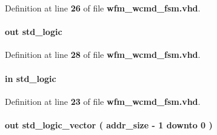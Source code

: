 Definition at line {\bf 26} of file {\bf wfm\+\_\+wcmd\+\_\+fsm.\+vhd}.

\paragraph[{wcmd\+\_\+brst\+\_\+en}]{ {\bfseries \textcolor{keywordflow}{out}\textcolor{vhdlchar}{ }} {\bfseries \textcolor{comment}{std\+\_\+logic}\textcolor{vhdlchar}{ }} \hspace{0.3cm}{\ttfamily [Port]}}\label{classwfm__wcmd__fsm_ab72031cd0cdd0c63ea34ae2f21d809da}


Definition at line {\bf 28} of file {\bf wfm\+\_\+wcmd\+\_\+fsm.\+vhd}.

\paragraph[{wcmd\+\_\+clk}]{ {\bfseries \textcolor{keywordflow}{in}\textcolor{vhdlchar}{ }} {\bfseries \textcolor{comment}{std\+\_\+logic}\textcolor{vhdlchar}{ }} \hspace{0.3cm}{\ttfamily [Port]}}\label{classwfm__wcmd__fsm_a61d32071a7feae60ffaf6be32920acff}


Definition at line {\bf 23} of file {\bf wfm\+\_\+wcmd\+\_\+fsm.\+vhd}.

\paragraph[{wcmd\+\_\+last\+\_\+addr}]{ {\bfseries \textcolor{keywordflow}{out}\textcolor{vhdlchar}{ }} {\bfseries \textcolor{comment}{std\+\_\+logic\+\_\+vector}\textcolor{vhdlchar}{ }\textcolor{vhdlchar}{(}\textcolor{vhdlchar}{ }\textcolor{vhdlchar}{ }\textcolor{vhdlchar}{ }\textcolor{vhdlchar}{ }{\bfseries {\bf addr\+\_\+size}} \textcolor{vhdlchar}{-\/}\textcolor{vhdlchar}{ } \textcolor{vhdldigit}{1} \textcolor{vhdlchar}{ }\textcolor{keywordflow}{downto}\textcolor{vhdlchar}{ }\textcolor{vhdlchar}{ } \textcolor{vhdldigit}{0} \textcolor{vhdlchar}{ }\textcolor{vhdlchar}{)}\textcolor{vhdlchar}{ }} \hspace{0.3cm}{\ttfamily [Port]}}\label{classwfm__wcmd__fsm_a9c0c96b10d46b49e0f479b1cc936a3ac}


